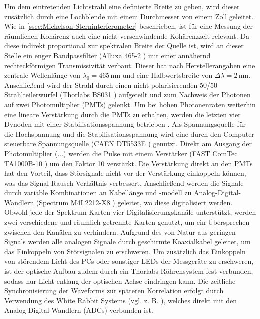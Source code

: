 Um dem eintretenden Lichtstrahl eine definierte Breite zu geben, wird dieser zusätzlich durch eine Lochblende mit einem Durchmesser von einem Zoll geleitet. 
Wie in \autoref{ssec:Michelson-Sterninterferometer} beschrieben, ist für eine Messung der räumlichen Kohärenz auch eine nicht verschwindende Kohärenzzeit relevant. 
Da diese indirekt proportional zur spektralen Breite der Quelle ist, wird an dieser Stelle ein enger Bandpassfilter (Alluxa 465-2 \cite{4652OD4Ultra}) mit einer annähernd rechteckförmigen Transmissivität verbaut. 
Dieser hat nach Herstellerangaben eine zentrale Wellenlänge von $\lambda_0 = 465\,\mathrm{nm}$ und eine Halbwertsbreite von  $\Delta\lambda = 2\,\mathrm{nm}$. 
Anschließend wird der Strahl durch einen nicht polarisierenden 50/50 Strahlteilerwürfel (Thorlabs BS031 \cite{ThorlabsBS03150}) aufgeteilt und zum Nachweis der Photonen auf zwei Photomultiplier (PMTs) gelenkt. 
Um bei hohen Photonenraten weiterhin eine lineare Verstärkung durch die PMTs zu erhalten, werden die letzten vier Dynoden mit einer Stabilisationsspannung betrieben \cite{zmijaOpticalIntensityInterferometry2021}. 
Als Spannungsquelle für die Hochspannung und die Stabilisationsspannung wird eine durch den Computer steuerbare Spannungsquelle (CAEN DT5533E \cite{DT5533E}) genutzt. 
Direkt am Ausgang der Photomultiplier (...) werden die Pulse mit einem Verstärker (FAST ComTec TA1000B-10 \cite{TA1000BTimingAmplifier}) um den Faktor 10 verstärkt. 
Die Verstärkung direkt an den PMTs hat den Vorteil, dass Störsignale nicht vor der Verstärkung einkoppeln können, was das Signal-Rausch-Verhältnis verbessert. 
Anschließend werden die Signale durch variable Kombinationen an Kabellänge und -modell zu Analog-Digital-Wandlern (Spectrum M4I.2212-X8 \cite{M4i2212x8Bit}) geleitet, wo diese digitalisiert werden. 
Obwohl jede der Spektrum-Karten vier Digitalisierungskanäle unterstützt, werden zwei verschiedene und räumlich getrennte Karten genutzt, um ein Übersprechen zwischen den Kanälen zu verhindern. 
Aufgrund des von Natur aus geringen Signals werden alle analogen Signale durch geschirmte Koaxialkabel geleitet, um das Einkoppeln von Störsignalen zu erschweren. 
Um zusätzlich das Einkoppeln von störendem Licht des PCs oder sonstiger LEDs der Messgeräte zu erschweren, ist der optische Aufbau zudem durch ein Thorlabs-Röhrensystem fest verbunden, sodass nur Licht entlang der optischen Achse eindringen kann. 
Die zeitliche Synchronisierung der Waveforms zur späteren Korrelation erfolgt durch Verwendung des White Rabbit Systems (vgl. z. B. \cite{lipinskiWhiteRabbitPTP2011}), welches direkt mit den Analog-Digital-Wandlern (ADCs) verbunden ist. 
